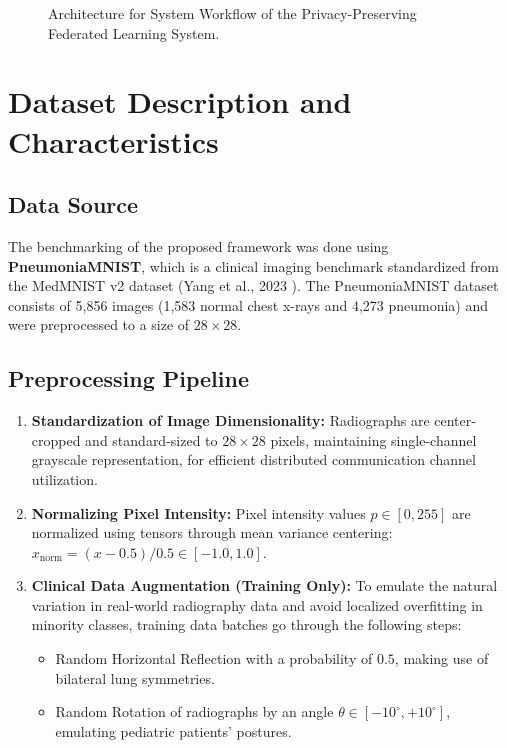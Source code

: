 \documentclass[12pt,a4paper]{report}
\begin{document}
\begin{figure}[htbp]
\caption{Architecture for System Workflow of the Privacy-Preserving Federated Learning System.}
\label{fig:workflow_block}
\end{figure}

\section{Dataset Description and Characteristics}
\subsection{Data Source}
The benchmarking of the proposed framework was done using \textbf{PneumoniaMNIST}, which is a clinical imaging benchmark standardized from the MedMNIST v2 dataset (Yang et al., 2023 \cite{yang2023medmnist}). The PneumoniaMNIST dataset consists of 5,856 images (1,583 normal chest x-rays and 4,273 pneumonia) and were preprocessed to a size of $28 \times 28$.

\subsection{Preprocessing Pipeline}
\begin{enumerate}
    \item \textbf{Standardization of Image Dimensionality:} Radiographs are center-cropped and standard-sized to $28 \times 28$ pixels, maintaining single-channel grayscale representation, for efficient distributed communication channel utilization.
    \item \textbf{Normalizing Pixel Intensity:} Pixel intensity values $p \in [0, 255]$ are normalized using tensors through mean variance centering: $x_{\text{norm}} = (x - 0.5) / 0.5 \in [-1.0, 1.0]$.
    \item \textbf{Clinical Data Augmentation (Training Only):} To emulate the natural variation in real-world radiography data and avoid localized overfitting in minority classes, training data batches go through the following steps:
    \begin{itemize}
        \item Random Horizontal Reflection with a probability of $0.5$, making use of bilateral lung symmetries.
        \item Random Rotation of radiographs by an angle $\theta \in [-10^\circ, +10^\circ]$, emulating pediatric patients’ postures.
    \end{itemize}
\end{enumerate}
\end{document}
